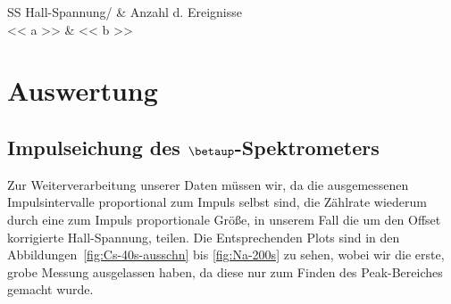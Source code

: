 \begin{table}[htbp]
    \centering
    \begin{tabular}{SS}
        {Hall-Spannung/\si{\skt}} & {Anzahl d. Ereignisse} \\
        \midrule
        << a >> & << b >> \\
    \end{tabular}
    \caption{%
        Messwerte zur Bestimmung des $\betaup$-Spektrums. Probe: ${}^{22}$Na,
        Zeit: \SI{200}{\second}, Transmission: \SI{4}{\percent}.
    }
    \label{tab:Na-200}
\end{table}

\chapter{Auswertung}

\section{Impulseichung des $\betaup$-Spektrometers}

Zur Weiterverarbeitung unserer Daten müssen wir, da die
ausgemessenen Impulsintervalle proportional zum Impuls selbst sind, die
Zählrate wiederum durch eine zum Impuls proportionale Größe, in unserem Fall
die um den Offset korrigierte Hall-Spannung, teilen. Die Entsprechenden Plots
sind in den Abbildungen~\ref{fig:Cs-40s-ausschn} bis \ref{fig:Na-200s} zu sehen,
wobei wir die erste, grobe Messung ausgelassen haben, da diese nur zum Finden
des Peak-Bereiches gemacht wurde.


